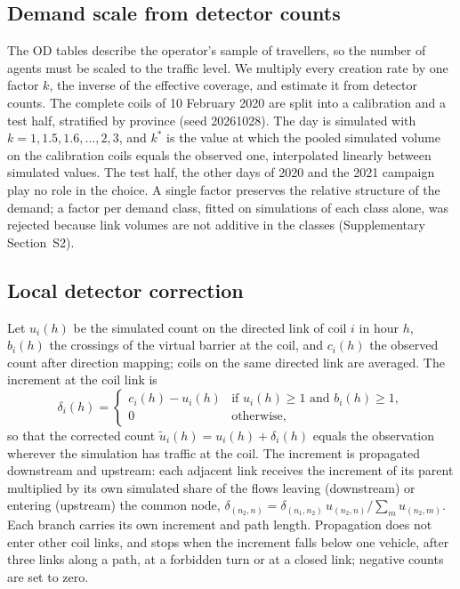 \documentclass[pdflatex,Numbered]{sn-jnl}
\begin{document}
\subsection{Demand scale from detector counts}
The OD tables describe the operator's sample of travellers, so the number of agents must be scaled to the traffic level. We multiply every creation rate by one factor $k$, the inverse of the effective coverage, and estimate it from detector counts. The complete coils of 10 February 2020 are split into a calibration and a test half, stratified by province (seed 20261028). The day is simulated with $k=1,1.5,1.6,\dots,2,3$, and $k^*$ is the value at which the pooled simulated volume on the calibration coils equals the observed one, interpolated linearly between simulated values. The test half, the other days of 2020 and the 2021 campaign play no role in the choice. A single factor preserves the relative structure of the demand; a factor per demand class, fitted on simulations of each class alone, was rejected because link volumes are not additive in the classes (Supplementary Section~S2).

\subsection{Local detector correction}
Let $u_i(h)$ be the simulated count on the directed link of coil $i$ in hour $h$, $b_i(h)$ the crossings of the virtual barrier at the coil, and $c_i(h)$ the observed count after direction mapping; coils on the same directed link are averaged. The increment at the coil link is
\begin{equation}
\delta_i(h)=\begin{cases} c_i(h)-u_i(h) & \text{if } u_i(h)\ge 1 \text{ and } b_i(h)\ge 1,\\ 0 & \text{otherwise,}\end{cases}
\label{eq:coil_residual}
\end{equation}
so that the corrected count $\widetilde u_i(h)=u_i(h)+\delta_i(h)$ equals the observation wherever the simulation has traffic at the coil. The increment is propagated downstream and upstream: each adjacent link receives the increment of its parent multiplied by its own simulated share of the flows leaving (downstream) or entering (upstream) the common node, $\delta_{(n_2,n)}=\delta_{(n_1,n_2)}\,u_{(n_2,n)}/\sum_m u_{(n_2,m)}$. Each branch carries its own increment and path length. Propagation does not enter other coil links, and stops when the increment falls below one vehicle, after three links along a path, at a forbidden turn or at a closed link; negative counts are set to zero.
\end{document}
